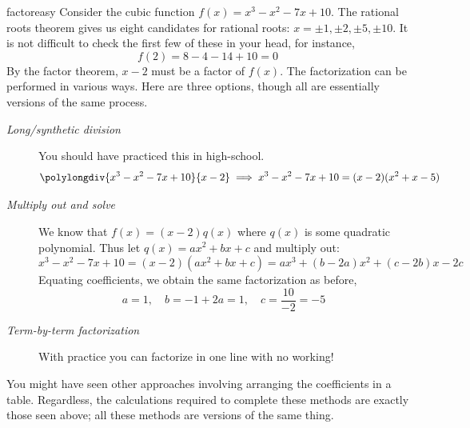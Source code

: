 \begin{example}{}{factoreasy}
	Consider the cubic function $f(x)=x^3-x^2-7x+10$. The rational roots theorem gives us eight candidates for rational roots: $x=\pm 1,\pm 2,\pm 5,\pm 10$. It is not difficult to check the first few of these in your head, for instance,
	\[
		f(2)=8-4-14+10=0
	\]
	By the factor theorem, $x-2$ must be a factor of $f(x)$. The factorization can be performed in various ways. Here are three options, though all are essentially versions of the same process.
	\begin{description}
	\item[\normalfont\emph{Long/synthetic division}]\lstsp You should have practiced this in high-school.
  \[
  	\polylongdiv{x^3-x^2-7x+10}{x-2} \implies x^3-x^2-7x+10=(x-2)(x^2+x-5)
  \]
  \item[\normalfont\emph{Multiply out and solve}]\lstsp We know that $f(x)=(x-2)q(x)$ where $q(x)$ is some quadratic polynomial. Thus let $q(x)=ax^2+bx+c$ and multiply out:
  \[
  	x^3-x^2-7x+10=(x-2)(ax^2+bx+c) =ax^3+(b-2a)x^2+(c-2b)x-2c
  \]
  Equating coefficients, we obtain the same factorization as before,
  \[
  	a=1,\quad b=-1+2a=1,\quad c=\frac{10}{-2}=-5
  \]
  \item[\normalfont\emph{Term-by-term factorization}]\lstsp With practice you can factorize in one line with no working!
\end{description}
	
	You might have seen other approaches involving arranging the coefficients in a table. Regardless, the calculations required to complete these methods are exactly those seen above; all these methods are versions of the same thing.
\end{example}

